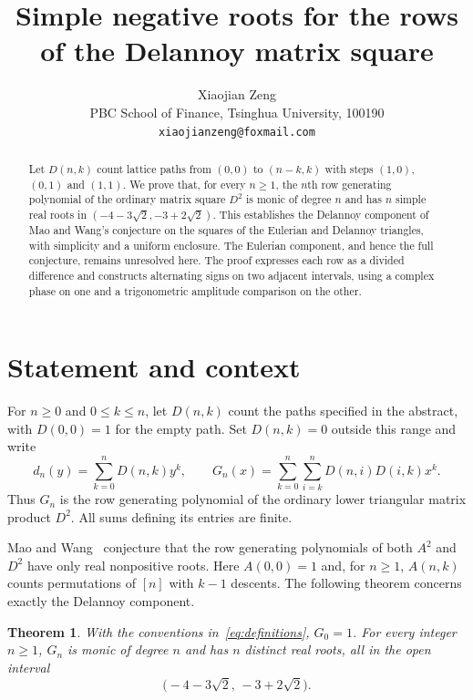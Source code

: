\documentclass[11pt]{article}
\title{Simple negative roots for the rows of the Delannoy matrix square}
\author{Xiaojian Zeng\\[3pt]
\small PBC School of Finance, Tsinghua University, 100190\\
\small \texttt{xiaojianzeng@foxmail.com}}
\date{}
\newtheorem{theorem}{Theorem}
\begin{document}
\maketitle
\begin{abstract}
Let $D(n,k)$ count lattice paths from $(0,0)$ to $(n-k,k)$ with steps
$(1,0)$, $(0,1)$ and $(1,1)$. We prove that, for every $n\geq1$, the
$n$th row generating polynomial of the ordinary matrix square $D^2$ is
monic of degree $n$ and has $n$ simple real roots in
$(-4-3\sqrt2,-3+2\sqrt2)$. This establishes the Delannoy component of
Mao and Wang's conjecture on the squares of the Eulerian and Delannoy
triangles, with simplicity and a uniform enclosure. The Eulerian component,
and hence the full conjecture, remains unresolved here. The proof expresses
each row as a divided difference and constructs alternating signs on two
adjacent intervals, using a complex phase on one and a trigonometric
amplitude comparison on the other.
\end{abstract}

\section{Statement and context}

For $n\geq0$ and $0\leq k\leq n$, let $D(n,k)$ count the paths specified
in the abstract, with $D(0,0)=1$ for the empty path. Set $D(n,k)=0$ outside
this range and write
\begin{equation}\label{eq:definitions}
 d_n(y)=\sum_{k=0}^n D(n,k)y^k,
 \qquad
 G_n(x)=\sum_{k=0}^n\sum_{i=k}^n D(n,i)D(i,k)x^k.
\end{equation}
Thus $G_n$ is the row generating polynomial of the ordinary lower
triangular matrix product $D^2$. All sums defining its entries are finite.

Mao and Wang~\cite[Conjecture~4.1, p.~11]{MaoWang2026} conjecture that
the row generating polynomials of both $A^2$ and $D^2$ have only real
nonpositive roots. Here $A(0,0)=1$ and, for $n\geq1$, $A(n,k)$ counts
permutations of $[n]$ with $k-1$ descents. The following theorem concerns
exactly the Delannoy component.

\begin{theorem}\label{thm:main}
With the conventions in~\eqref{eq:definitions}, $G_0=1$. For every integer
$n\geq1$, $G_n$ is monic of degree $n$ and has $n$ distinct real roots,
all in the open interval
\[
 \bigl(-4-3\sqrt2,\,-3+2\sqrt2\bigr).
\]
\end{theorem}
\end{document}
